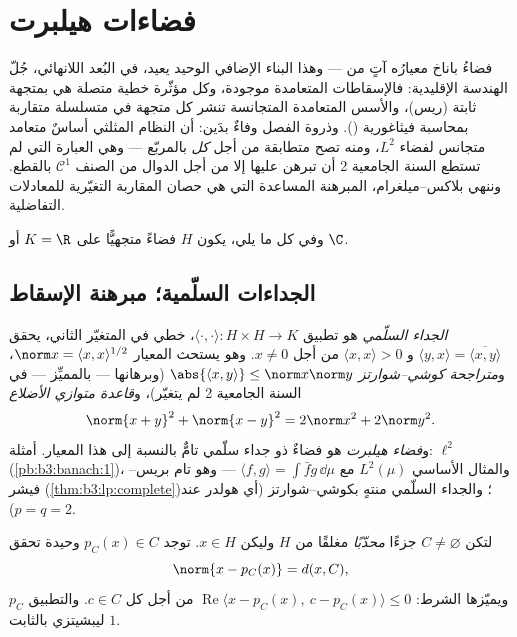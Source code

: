 \chapter{فضاءات هيلبرت}\label{ch:b3:hilbert}

 فضاءُ باناخ معيارُه آتٍ من  --- وهذا
البناء الإضافي الوحيد يعيد، في البُعد اللانهائي، جُلّ الهندسة
الإقليدية: فالإسقاطات المتعامدة موجودة، وكل مؤثّرة خطية متصلة
هي  بمتجهة ثابتة (ريس)، والأسس المتعامدة المتجانسة
تنشر كل متجهة في متسلسلة متقاربة بمحاسبة فيثاغورية ().
وذروة الفصل وفاءٌ بدَين: أن النظام المثلثي أساسٌ متعامد متجانس
لفضاء $L^2$، ومنه تصح متطابقة  من أجل \emph{كل}  بالمربّع --- وهي العبارة التي لم تستطع السنة
الجامعية 2 أن تبرهن عليها إلا من أجل الدوال من الصنف
$\mathcal C^1$ بالقطع. وننهي بلاكس--ميلغرام، المبرهنة المساعدة
التي هي حصان المقاربة التغيّرية للمعادلات التفاضلية.

وفي كل ما يلي، يكون $H$ فضاءً متجهيًّا على $K = \R$ أو $\C$.

\section{الجداءات السلّمية؛ مبرهنة الإسقاط}

\begin{definition}\label{def:b3:hilbert:inner}
\emph{الجداء السلّمي} هو تطبيق $\langle
\cdot,\cdot\rangle \colon H\times H \to K$، خطي في
المتغيّر الثاني، يحقق $\langle y, x\rangle =
\overline{\langle x, y\rangle}$ و $\langle x, x\rangle > 0$ من أجل $x \neq 0$. وهو
يستحث المعيار $\norm x = \langle x,
x\rangle^{1/2}$، و\emph{متراجحة كوشي--شوارتز} $\abs{\langle x, y\rangle} \leq \norm x\norm y$ (وبرهانها
--- بالمميِّز --- في السنة الجامعية 2 لم يتغيّر)،
و\emph{قاعدة متوازي الأضلاع}
\[
\norm{x + y}^2 + \norm{x - y}^2 = 2\norm x^2 + 2\norm y^2 .
\]
و\emph{فضاء هيلبرت} هو فضاءٌ ذو جداء سلّمي
تامٌّ بالنسبة إلى هذا المعيار. أمثلة: $\ell^2$ (\cref{pb:b3:banach:1})،
والمثال الأساسي $L^2(\mu)$ مع $\langle f, g\rangle = \int\bar fg\,\dd\mu$ --- وهو تام بريس--فيشر
(\cref{thm:b3:lp:complete})؛ والجداء السلّمي منتهٍ بكوشي--شوارتز (أي هولدر
عند $p = q = 2$).
\end{definition}

\begin{theorem}
\label{thm:b3:hilbert:projection}
لتكن $C \neq \varnothing$ جزءًا \emph{محدّبًا} مغلقًا من  $H$
وليكن $x \in H$. توجد $p_C(x)
\in C$ وحيدة تحقق
\[
\norm{x - p_C(x)} = d(x, C),
\]
ويميّزها الشرط: $\operatorname{Re}\langle x - p_C(x),\ c -
p_C(x)\rangle \leq 0$ من أجل كل $c \in C$. والتطبيق $p_C$
ليبشيتزي بالثابت $1$.
\end{theorem}

